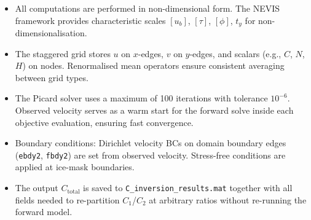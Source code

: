 \documentclass[a4paper,11pt,fleqn]{article}
\begin{document}
\begin{itemize}
    \item All computations are performed in non-dimensional form. The NEVIS framework provides characteristic scales $[u_b]$, $[\tau]$, $[\phi]$, $t_y$ for non-dimensionalisation.
    
    \item The staggered grid stores $u$ on $x$-edges, $v$ on $y$-edges, and scalars (e.g., $C$, $N$, $H$) on nodes. Renormalised mean operators ensure consistent averaging between grid types.
    
    \item The Picard solver uses a maximum of 100 iterations with tolerance $10^{-6}$. Observed velocity serves as a warm start for the forward solve inside each objective evaluation, ensuring fast convergence.
    
    \item Boundary conditions: Dirichlet velocity BCs on domain boundary edges (\texttt{ebdy2}, \texttt{fbdy2}) are set from observed velocity. Stress-free conditions are applied at ice-mask boundaries.
    
    \item The output $C_{\mathrm{total}}$ is saved to \texttt{C\_inversion\_results.mat} together with all fields needed to re-partition $C_1$/$C_2$ at arbitrary ratios without re-running the forward model.
\end{itemize}
\end{document}
